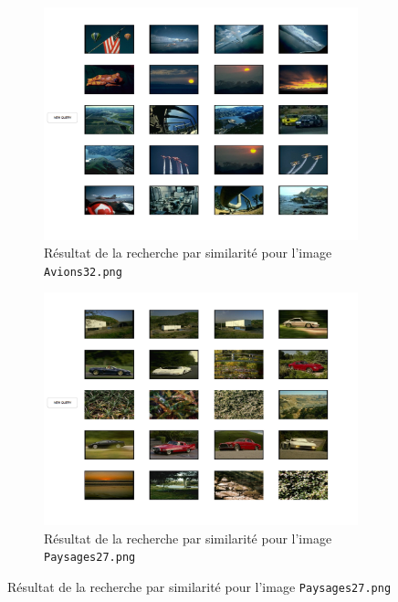\documentclass[a4paper]{article}
\begin{document}
\begin{figure}[H]
    \centering
     
    \begin{subfigure}[c]{0.6\textwidth}
        \centering
        \includegraphics[width=\textwidth]{images/query50.png}
        \caption{Résultat de la recherche par similarité pour l'image
        \texttt{Avions32.png}}
        \label{subfig:ex2_query50}
    \end{subfigure}
    \begin{subfigure}[c]{0.6\textwidth}
        \centering
        \includegraphics[width=\textwidth]{images/query550.png}
        \caption{Résultat de la recherche par similarité pour l'image
    \texttt{Paysages27.png}}
        \label{subfig:ex2_query550}

\end{subfigure}
\end{figure}
\end{document}

